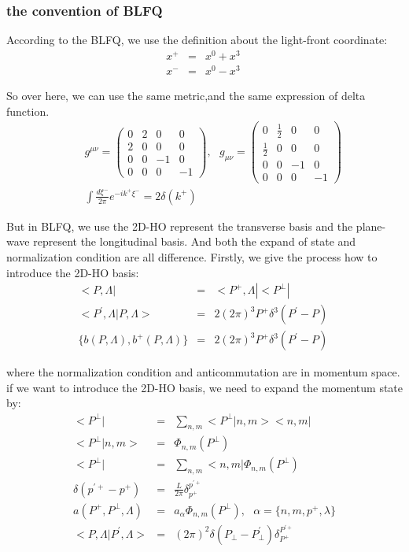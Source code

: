 \documentclass[a4paper,12pt]{article}
\begin{document}
\subsubsection{the convention of BLFQ}

According to the BLFQ, we use the definition about the light-front coordinate:
\begin{eqnarray}
  x^+ &=& x^0 + x^3 \nonumber\\
  x^- &=& x^0 - x^3 \nonumber\
\end{eqnarray}

So over here, we can use the same metric,and the same expression of delta function.
\begin{eqnarray}
  &&g^{\mu\nu} =
  \begin{pmatrix}
  0 & 2 & 0 & 0 \\
  2 & 0 & 0 & 0 \\
  0 & 0 & -1 & 0 \\
  0 & 0 & 0 & -1
\end{pmatrix},\ \ \
g_{\mu\nu} =
\begin{pmatrix}
  0 & \frac{1}{2} & 0 & 0 \\
  \frac{1}{2} & 0 & 0 & 0 \\
  0 & 0 & -1 & 0 \\
  0 & 0 & 0 & -1
\end{pmatrix}
\nonumber\\
&&\int \frac{d \xi^-}{2\pi} e^{-i k^+ \xi^-} = 2\delta(k^+)\nonumber\
\end{eqnarray}

But in BLFQ, we use the 2D-HO represent the transverse basis and the plane-wave represent the longitudinal basis. And both the expand of state and normalization condition are all difference. Firstly, we give the process how to introduce the 2D-HO basis:
\begin{eqnarray}
  <P,\Lambda| &=& <P^+,\Lambda|<P^{\perp}|\nonumber\\
  <P^{\prime},\Lambda|P,\Lambda> &=& 2(2\pi)^3 P^+ \delta^3(P^{\prime} - P) \nonumber\\
  \{b(P,\Lambda),b^+(P,\Lambda)\} &=& 2(2\pi)^3 P^+ \delta^3(P^{\prime} - P) \nonumber\
\end{eqnarray}

where the normalization condition and anticommutation are in momentum space. if we want to introduce the 2D-HO basis, we need to expand the momentum state by:
\begin{eqnarray}
  <P^{\perp}| &=& \sum_{n,m} <P^{\perp}|n,m><n,m|\nonumber\\
  <P^{\perp}|n,m> &=& \Phi_{n,m}(P^{\perp})\nonumber\\
  <P^{\perp}| &=& \sum_{n,m} <n,m|\Phi_{n,m}(P^{\perp})\nonumber\\
  \delta(p^{\prime +}-p^+) &=& \frac{L}{2\pi} \delta^{p^{\prime +}}_{p^+}\nonumber\\
  a(P^+,P^{\perp},\Lambda) &=& a_{\alpha} \Phi_{n,m}(P^{\perp}), \ \ \ \alpha=\{n,m,p^+,\lambda\}\nonumber\\
  <P,\Lambda|P^{\prime},\Lambda> &=& (2\pi)^2\delta (P_{\perp}-P_{\perp}^{\prime}) \delta_{P^+}^{P^{\prime +}}\nonumber\
\end{eqnarray}
\end{document}
